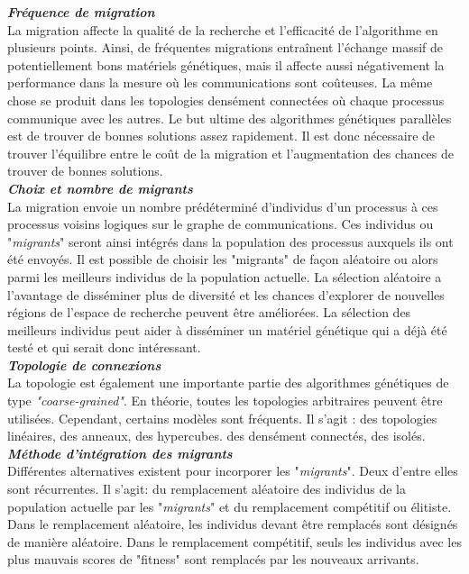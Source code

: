 	\textsl{\textbf{Fréquence de migration}} \\
	\hspace*{.5cm} La migration affecte la qualité de la recherche et l'efficacité de l'algorithme en plusieurs points. Ainsi, de fréquentes migrations entraînent l'échange massif de potentiellement bons matériels génétiques, mais il affecte aussi négativement la performance dans la mesure où les communications sont coûteuses. La même chose se produit dans les topologies densément connectées où chaque processus communique avec les autres. Le but ultime des algorithmes génétiques parallèles est de trouver de bonnes solutions assez rapidement. Il est donc nécessaire de trouver l'équilibre entre le coût de la migration et l'augmentation des chances de trouver de bonnes solutions.\\
	
	\textsl{\textbf{Choix et nombre de migrants}} \\
	\hspace*{.5cm}La migration envoie un nombre prédéterminé d'individus d'un processus à ces processus voisins logiques sur le graphe de communications. Ces individus ou "\emph{migrants}" seront ainsi intégrés dans la population des processus auxquels ils ont été envoyés. Il est possible de choisir les "migrants" de façon aléatoire ou alors parmi les meilleurs individus de la population actuelle. La sélection aléatoire a l'avantage de disséminer plus de diversité et les chances d'explorer de nouvelles régions de l'espace de recherche peuvent être améliorées. La sélection des meilleurs individus peut aider à disséminer un matériel génétique qui a déjà été testé et qui serait donc intéressant.\\
	
	\textsl{\textbf{Topologie de connexions}}\\
	\hspace*{.5cm} La topologie est également une importante partie des algorithmes génétiques de type \emph{"coarse-grained"}. En théorie, toutes les topologies arbitraires peuvent être utilisées. Cependant, certains modèles sont fréquents. Il s'agit : des topologies linéaires, des anneaux, des hypercubes. des densément connectés, des isolés.\\
	
	\textsl{\textbf{Méthode d'intégration des migrants}}\\
 	\hspace*{.5cm} Différentes alternatives existent pour incorporer les "\emph{migrants}". Deux d'entre elles sont récurrentes. Il s'agit: du remplacement aléatoire des individus de la population actuelle par les "\emph{migrants}" et du remplacement compétitif ou élitiste. Dans le remplacement aléatoire, les individus devant être remplacés sont désignés de manière aléatoire. Dans le remplacement compétitif, seuls les individus avec les plus mauvais scores de "fitness" sont remplacés par les nouveaux arrivants.
	
